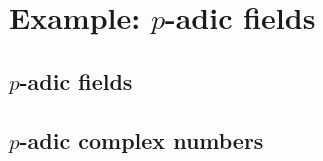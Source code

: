 \section[Example: p-adic fields]{Example: \(p\)-adic fields}

\subsection[p-adic fields]{\(p\)-adic fields}

\subsection[p-adic complex numbers]{\(p\)-adic complex numbers}
